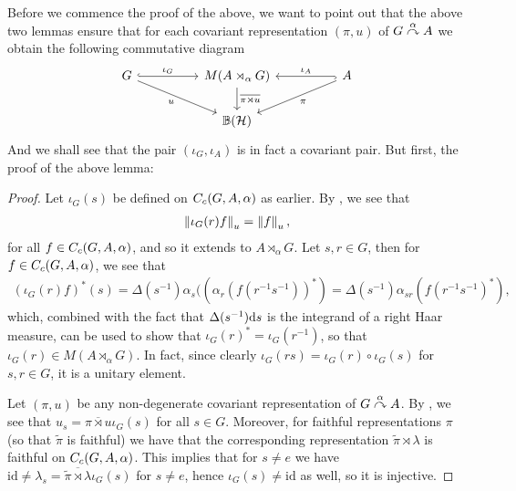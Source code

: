 Before we commence the proof of the above, we want to point out that the above two lemmas ensure that for each covariant representation $(\pi , u)$ of $G \stackrel{\alpha}{\curvearrowright} A$ we obtain the following commutative diagram
\begin{equation}
\begin{tikzcd}
	G \arrow[rr, "\iota_G", hook] \arrow[rrd, "u"'] && M(A \rtimes_\alpha G) \arrow[d, "\overline{\pi \rtimes u }"] && A \arrow[ll,"\iota_A"',hook] \arrow[lld, "\pi"]\\
	& &\mathbb{B}(\H)&&
\end{tikzcd}
\label{diag:iotacom}
\end{equation}
And we shall see that the pair $(\iota_G, \iota_A)$ is in fact a covariant pair. But first, the proof of the above lemma:
\begin{proof}
Let $\iota_G(s)$ be defined on $C_c(G,A,\alpha)$ as earlier. By , we see that
\begin{align*}
	\left\lVert \iota_G(r) f \right\rVert_u = \left\lVert f \right\rVert_u,
\end{align*}
for all $f \in C_c(G,A,\alpha)$, and so it extends to $A \rtimes_\alpha G$. Let $s,r \in G$, then for $f \in C_c(G,A,\alpha)$, we see that
\begin{align*}
	(\iota_G(r) f)^*(s) = \Delta(s^{-1}) \alpha_s ( (\alpha_r(f(r^{-1}s^{-1}))^*)= \Delta(s^{-1}) \alpha_{sr}(f(r^{-1}s^{-1})^*),
\end{align*}
which, combined with the fact that $\Delta(s^{-1}) \mathrm{d} s$ is the integrand of a right Haar measure, can be used to show that $\iota_G(r)^* = \iota_G(r^{-1})$, so that $\iota_G(r) \in M(A \rtimes_\alpha G)$. In fact, since clearly $\iota_G(rs) = \iota_G(r) \circ \iota_G(s)$ for $s,r \in G$, it is a unitary element.

Let $(\pi,u)$ be any non-degenerate covariant representation of $G \stackrel{\alpha}{\curvearrowright} A$. By , we see that $u_s  = \overline{ \pi \rtimes u} \iota_G(s)$ for all $ s \in G$. Moreover, for faithful representations $\pi$ (so that $\tilde \pi$ is faithful) we have that the corresponding representation $\tilde \pi \rtimes \lambda$ is faithful on $C_c(G,A,\alpha)$. This implies that for $s \neq e$ we have $\mathrm{id} \neq \lambda_s = \overline{\tilde \pi \rtimes \lambda} \iota_G(s)$ for $s \neq e$, hence $\iota_G(s) \neq \mathrm{id}$ as well, so it is injective.
	


\end{proof}
